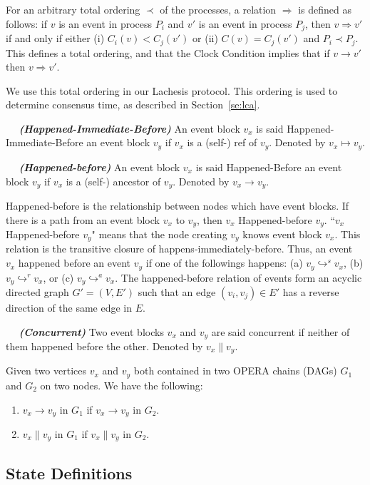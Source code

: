 \documentclass{article}
\newcommand{\dfnn}[2]{$\quad$ \textbf{\emph{(#1)}} {#2}}
\newcommand{\eself}{\hookrightarrow^{s}}
\newcommand{\eref}{\hookrightarrow^{r}}
\newcommand{\eancestor}{\hookrightarrow^{a}}
\newcommand{\hibefore}{\mapsto}
\newcommand{\hbefore}{\rightarrow}
\newcommand{\concur}{\parallel}
\begin{document}
For an arbitrary total ordering $\prec$ of the processes, a relation $\Rightarrow$ is defined as follows: if $v$ is an event in process $P_i$ and $v'$ is an event in process $P_j$, then $v \Rightarrow v'$ if and only if either (i) $C_i(v) < C_j(v')$ or (ii) $C(v)= C_j(v')$ and $P_i \prec P_j$. This defines a total ordering, and that the Clock Condition implies that if $v \rightarrow v'$ then $v \Rightarrow v'$. 

We use this total ordering in our Lachesis protocol. This ordering is used to determine consensus time, as described in Section~\ref{se:lca}.

\dfnn{Happened-Immediate-Before}{An event block $v_x$ is said Happened-Immediate-Before an event block $v_y$ if $v_x$ is a (self-) ref of $v_y$. Denoted by $v_x \hibefore v_y$.}

\dfnn{Happened-before}{An event block $v_x$ is said Happened-Before an event block $v_y$ if $v_x$ is a (self-) ancestor of $v_y$. Denoted by $v_x \hbefore v_y$.}

Happened-before is the relationship between nodes which have event blocks. If there is a path from an event block $v_x$ to $v_y$, then $v_x$ Happened-before $v_y$. ``$v_x$ Happened-before $v_y$" means that the node creating $v_y$ knows event block $v_x$. This relation is the transitive closure of happens-immediately-before. Thus, an event $v_x$ happened before an event $v_y$ if one of the followings happens: (a) $v_y \eself v_x$, (b) $v_y \eref v_x$,  or (c) $v_y \eancestor v_x$. The happened-before relation of events form an acyclic directed graph $G' = (V, E')$ such that an edge $(v_i,v_j) \in E'$ has a reverse direction of the same edge in $E$.

\dfnn{Concurrent}{Two event blocks $v_x$ and $v_y$ are said concurrent if neither of them  happened before the other. Denoted by $v_x \concur v_y$.}

Given two vertices $v_x$ and $v_y$ both contained in two OPERA chains (DAGs) $G_1$ and $G_2$ on two nodes. We have the following:
\begin{enumerate}[(1)]
\item $v_x \hbefore v_y$ in $G_1$ if $v_x \hbefore v_y$ in $G_2$.
\item $v_x \concur v_y$ in $G_1$ if $v_x \concur v_y$ in $G_2$.
\end{enumerate}

\subsection{State Definitions}
\end{document}
